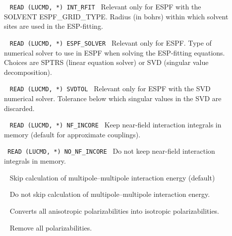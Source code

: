 \begin{description}
\item[]\verb| |\newline
\verb|READ (LUCMD, *) INT_RFIT|\verb| |\newline
Relevant only for ESPF with the SOLVENT ESPF\_GRID\_TYPE. Radius (in bohrs) within which solvent sites are used in the ESP-fitting. 

\item[]\verb| |\newline
\verb|READ (LUCMD, *) ESPF_SOLVER|\verb| |\newline
Relevant only for ESPF. Type of numerical solver to use in ESPF when solving the ESP-fitting equations. Choices are SPTRS (linear equation solver) or SVD (singular value decomposition).

\item[]\verb| |\newline
\verb|READ (LUCMD, *) SVDTOL|\verb| |\newline
Relevant only for ESPF with the SVD numerical solver. Tolerance below which singular values in the SVD are discarded.

\item[]\verb| |\newline
\verb|READ (LUCMD, *) NF_INCORE|\verb| |\newline
Keep near-field interaction integrals in memory (default for approximate couplings).

\item[]\verb| |\newline
\verb|READ (LUCMD, *) NO_NF_INCORE|\verb| |\newline
Do not keep near-field interaction integrals in memory.

\item[]\verb| |\newline
Skip calculation of multipole--multipole interaction energy (default)

\item[]\verb| |\newline
Do not skip calculation of multipole--multipole interaction energy.

\item[]\verb| |\newline
Converts all anisotropic polarizabilities into isotropic polarizabilities.

\item[]\verb| |\newline
Remove all polarizabilities.


\end{description}
